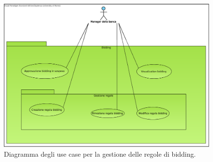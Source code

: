 \begin{figure}
	\centering
	\includegraphics[width=\textwidth]{Images/use-cases/Definizione_parametri_e_approvazione_bidding.eps}
	\caption{Diagramma degli use case per la gestione delle regole di bidding.}
	\label{fig:use-cases:amministrazione:gestione-bidding}
\end{figure}
